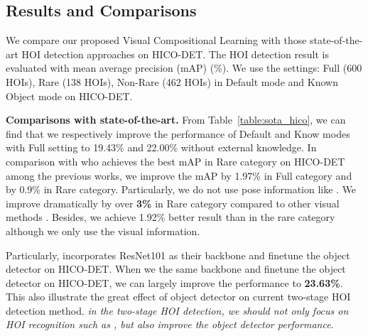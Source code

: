 \documentclass[runningheads]{llncs}
\begin{document}
\subsection{Results and Comparisons}

We compare our proposed Visual Compositional Learning with
those state-of-the-art HOI detection approaches \cite{qi2018learning, gao2018ican, li2018transferable, gupta2018no, wang2019deep, xu2019learning, wan2019pose, Peyre_2019_ICCV, bansal2019detecting}
on HICO-DET. The HOI detection result is evaluated with mean average precision (mAP) (\%). We use the settings: Full (600 HOIs), Rare (138 HOIs), Non-Rare (462 HOIs) in Default mode and Known Object mode on HICO-DET.


{\bf Comparisons with state-of-the-art.} From Table~\ref{table:sota_hico}, we can find that we respectively improve the performance of Default and Know modes with Full setting to 19.43\% and 22.00\% without external knowledge.
In comparison with \cite{wan2019pose} who achieves the best mAP in Rare category on HICO-DET among the previous works,
we improve the mAP by 1.97\% in Full category and by 0.9\% in Rare category. Particularly, we do not use pose information like \cite{wan2019pose}. We improve dramatically by over {\bf 3\%} in Rare category compared to other visual methods \cite{qi2018learning, gao2018ican, li2018transferable, gupta2018no, Zhou_2019_ICCV}. Besides, we achieve 1.92\% better result than \cite{Peyre_2019_ICCV} in the rare category although we only use the visual information.

Particularly, \cite{bansal2019detecting} incorporates ResNet101 as their backbone and finetune the object detector on HICO-DET. When we the same backbone and finetune the object detector on HICO-DET, we can largely improve the performance to {\bf 23.63\%}. This also illustrate the great effect of object detector on current two-stage HOI detection method.
\textit{in the two-stage HOI detection, we should not only focus on HOI recognition such as \cite{gao2018ican, li2018transferable, Zhou_2019_ICCV}, but also improve the object detector performance}.
\end{document}
